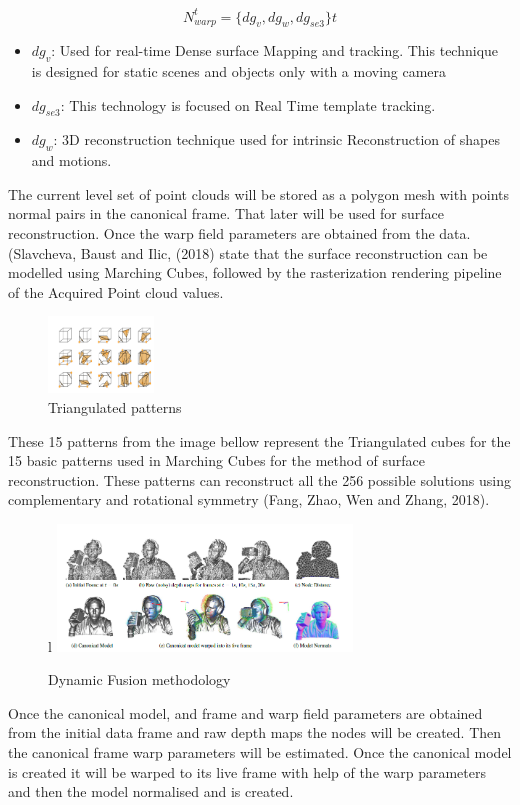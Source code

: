 \documentclass[a4paper]{article}
\begin{document}
\[N_{warp}^t=\{dg_v,dg_w,dg_{se3}\}t\]
\begin{itemize}[label =]
    \item $dg_{v}$: Used for real-time Dense surface Mapping and tracking. This technique is designed for static scenes and objects only with a moving camera
    \item $dg_{se3}$: This technology is focused on Real Time template tracking.
    \item $dg_{w}$: 3D reconstruction technique used for intrinsic Reconstruction of shapes and motions. 
\end{itemize}
The current level set of point clouds will be stored as a polygon mesh with points normal pairs in the canonical frame. That later will be used for surface reconstruction.   
Once the warp field parameters are obtained from the data.(Slavcheva, Baust and Ilic, (2018) state that  the surface reconstruction can be modelled using Marching Cubes, followed by the rasterization rendering pipeline of the Acquired Point cloud values.\\
\begin{figure} %
    \centering
    \includegraphics[width=0.25\textwidth]{shapes.png}
    \caption{Triangulated patterns \cite[]{fang_zhao_wen_zhang_2018}}
\end{figure}
These 15 patterns from the image bellow represent the Triangulated cubes for the 15 basic patterns used in Marching Cubes for the method of surface reconstruction. These patterns can reconstruct all the 256 possible solutions using complementary and rotational symmetry (Fang, Zhao, Wen and Zhang, 2018).
\begin{figure}{l} %
    \centering
    \includegraphics[width=0.7\textwidth]{dynamicfusion2.png}
    \caption{Dynamic Fusion methodology \cite[]{newcombe_fox_seitz_2015}}
\end{figure}
Once the canonical model, and frame and warp field parameters are obtained from the initial data frame and raw depth maps the nodes will be created. Then the canonical frame warp parameters will be estimated. Once the canonical model is created it will be warped to its live frame with help of the warp parameters and then the model normalised and is created. \\
\enlargethispage{\baselineskip}
\end{document}
